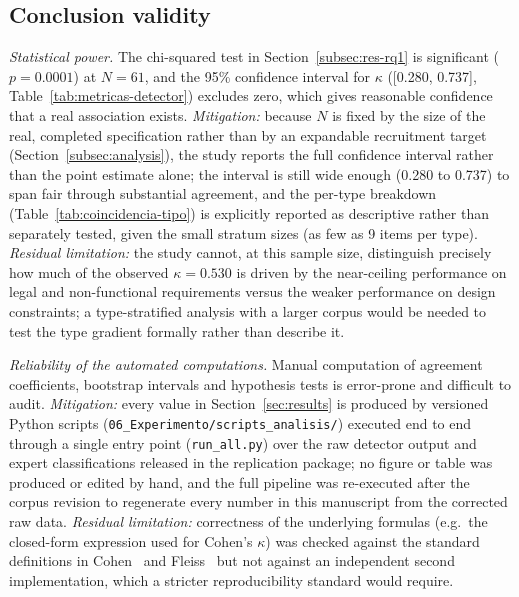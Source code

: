 \documentclass[pdflatex,sn-mathphys-num]{sn-jnl}
\theoremstyle{thmstyleone}%
\theoremstyle{thmstyletwo}%
\theoremstyle{thmstylethree}%
\begin{document}
	\subsection{Conclusion validity}\label{subsec:threats-conclusion}
	
	\emph{Statistical power.} The chi-squared test in
	Section~\ref{subsec:res-rq1} is significant ($p=0.0001$) at $N=61$, and the
	95\% confidence interval for $\kappa$ ([0.280, 0.737], Table~\ref{tab:metricas-detector})
	excludes zero, which gives reasonable confidence that a real association
	exists. \emph{Mitigation:} because $N$ is fixed by the size of the real,
	completed specification rather than by an expandable recruitment target
	(Section~\ref{subsec:analysis}), the study reports the full confidence
	interval rather than the point estimate alone; the interval is still wide
	enough (0.280 to 0.737) to span fair through substantial agreement, and the
	per-type breakdown (Table~\ref{tab:coincidencia-tipo}) is explicitly reported
	as descriptive rather than separately tested, given the small stratum sizes
	(as few as 9 items per type). \emph{Residual limitation:} the study cannot, at
	this sample size, distinguish precisely how much of the observed $\kappa=0.530$
	is driven by the near-ceiling performance on legal and non-functional
	requirements versus the weaker performance on design constraints; a
	type-stratified analysis with a larger corpus would be needed to test the
	type gradient formally rather than describe it.
	
	\emph{Reliability of the automated computations.} Manual computation of
	agreement coefficients, bootstrap intervals and hypothesis tests is error-prone
	and difficult to audit. \emph{Mitigation:} every value in
	Section~\ref{sec:results} is produced by versioned Python scripts
	(\texttt{06\_Experimento/scripts\_analisis/}) executed end to end through a
	single entry point (\texttt{run\_all.py}) over the raw detector output and
	expert classifications released in the replication package; no figure or table
	was produced or edited by hand, and the full pipeline was re-executed after the
	corpus revision to regenerate every number in this manuscript from the
	corrected raw data. \emph{Residual limitation:} correctness of the underlying
	formulas (e.g.\ the closed-form expression used for Cohen's $\kappa$) was
	checked against the standard definitions in Cohen~\cite{cohen1960} and
	Fleiss~\cite{fleiss1971} but not against an independent second implementation,
	which a stricter reproducibility standard would require.
	
	
	
\end{document}
